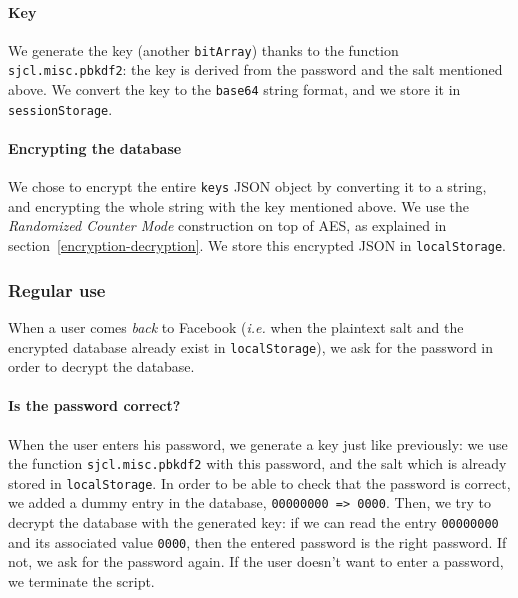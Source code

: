 \documentclass[10pt,twocolumn]{article}
\begin{document}
\paragraph{Key}
We generate the key (another \texttt{bitArray}) thanks to the function \texttt{sjcl.misc.pbkdf2}: the key is derived from the password and the salt mentioned above. We convert the key to the \texttt{base64} string format, and we store it in \texttt{sessionStorage}.

\paragraph{Encrypting the database}
We chose to encrypt the entire \texttt{keys} JSON object by converting it to a string, and encrypting the whole string with the key mentioned above. We use the \textit{Randomized Counter Mode} construction on top of AES, as explained in section~\ref{encryption-decryption}. We store this encrypted JSON in \texttt{localStorage}.


\subsubsection{Regular use}

When a user comes \textit{back} to Facebook (\emph{i.e.} when the plaintext salt and the encrypted database already exist in \texttt{localStorage}), we ask for the password in order to decrypt the database. 

\paragraph{Is the password correct?}

When the user enters his password, we generate a key just like previously: we use the function \texttt{sjcl.misc.pbkdf2} with this password, and the salt which is already stored in \texttt{localStorage}. In order to be able to check that the password
is correct, we added a dummy entry in the database, \texttt{00000000 => 0000}.
Then, we try to decrypt the database with the generated key: if we can read the entry \texttt{00000000} and its associated value \texttt{0000}, then the entered password is the right password. If not, we ask for the password again. If the user doesn't want to enter a password, we terminate the script.


\end{document}
